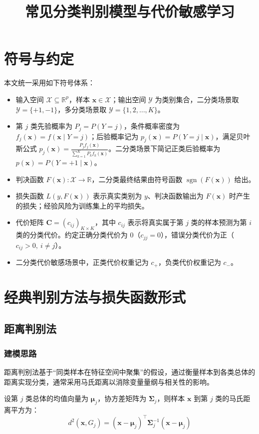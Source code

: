 \documentclass[12pt,a4paper]{article}
\title{常见分类判别模型与代价敏感学习}
\author{}
\date{} %
\DeclareMathOperator{\sgn}{sgn}
\newcommand{\x}{\boldsymbol{x}}
\newcommand{\muu}{\boldsymbol{\mu}}
\newcommand{\Sig}{\boldsymbol{\Sigma}}
\begin{document}
\maketitle
\section*{符号与约定}
本文统一采用如下符号体系：
\begin{itemize}
    \item 输入空间 $\mathcal{X} \subseteq \mathbb{R}^p$，样本 $\x \in \mathcal{X}$；输出空间 $\mathcal{Y}$ 为类别集合，二分类场景取 $\mathcal{Y} = \{+1, -1\}$，多分类场景取 $\mathcal{Y} = \{1, 2, \dots, K\}$。
    \item 第 $j$ 类先验概率为 $P_j = P(Y=j)$，条件概率密度为 $f_j(\x) = f(\x \mid Y=j)$；后验概率记为 $p_j(\x) = P(Y=j \mid \x)$，满足贝叶斯公式 $p_j(\x) = \frac{P_j f_j(\x)}{\sum_{k=1}^K P_k f_k(\x)}$。二分类场景下简记正类后验概率为 $p(\x) = P(Y=+1 \mid \x)$。
    \item 判决函数 $F(\x): \mathcal{X} \to \mathbb{R}$，二分类最终结果由符号函数 $\sgn(F(\x))$ 给出。
    \item 损失函数 $L(y, F(\x))$ 表示真实类别为 $y$、判决函数输出为 $F(\x)$ 时产生的损失；经验风险为训练集上的平均损失。
    \item 代价矩阵 $\boldsymbol{C} = (c_{ij})_{K \times K}$，其中 $c_{ij}$ 表示将真实属于第 $j$ 类的样本预测为第 $i$ 类的分类代价。约定正确分类代价为 0（$c_{jj} = 0$），错误分类代价为正（$c_{ij} > 0, \ i \neq j$）。
    \item 二分类代价敏感场景中，正类代价权重记为 $c_+$，负类代价权重记为 $c_-$。
\end{itemize}

\section{经典判别方法与损失函数形式}
\subsection{距离判别法}
\subsubsection{建模思路}
距离判别法基于“同类样本在特征空间中聚集”的假设，通过衡量样本到各类总体的距离实现分类，通常采用马氏距离以消除变量量纲与相关性的影响。

设第 $j$ 类总体的均值向量为 $\muu_j$，协方差矩阵为 $\Sig_j$，则样本 $\x$ 到第 $j$ 类的马氏距离平方为：
$$
d^2(\x, G_j) = (\x - \muu_j)^\top \Sig_j^{-1} (\x - \muu_j)
$$
\end{document}
